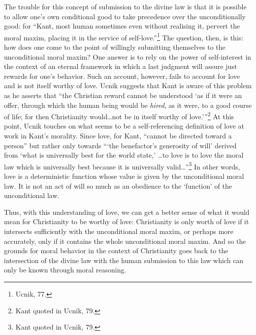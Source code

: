 \documentclass[12pt]{article}
\begin{document}
	The trouble for this concept of submission to the divine law is that it is possible to allow one's own conditional good to take precedence over the unconditionally good: for ``Kant, most human sometimes even without realising it, pervert the moral maxim, placing it in the service of self-love.''\footnote{Ucnik, 77.} The question, then, is this: how does one come to the point of willingly submitting themselves to the unconditional moral maxim? One answer is to rely on the power of self-interest in the context of an eternal framework in which a last judgment will assure just rewards for one's behavior. Such an account, however, fails to account for love and is not itself worthy of love. Ucnik suggests that Kant is aware of this problem as he asserts that ``the Christian reward cannot be understood `as if it were an offer, through which the human being would be \emph{hired}, as it were, to a good course of life; for then Christianity would\ldots not be in itself worthy of love.'\thinspace''\footnote{Kant quoted in Ucnik, 79.} At this point, Ucnik touches on what seems to be a self-referencing definition of love at work in Kant's morality. Since love, for Kant, ``cannot be directed toward a person'' but rather only towards ``\thinspace`the benefactor's generosity of will' derived from `what is universally best for the world state,' \ldots to love is to love the moral law which is universally best because it is universally valid\ldots''\footnote{Kant quoted in Ucnik, 79.} In other words, love is a deterministic function whose value is given by the unconditional moral law. It is not an act of will so much as an obedience to the `function' of the unconditional law. 
	
	Thus, with this understanding of love, we can get a better sense of what it would mean for Christianity to be worthy of love: Christianity is only worth of love if it intersects sufficiently with the unconditional moral maxim, or perhaps more accurately, only if it contains the whole unconditional moral maxim. And so the grounds for moral behavior in the context of Christianity goes back to the intersection of the divine law with the human submission to this law which can only be known through moral reasoning.  
\end{document}
